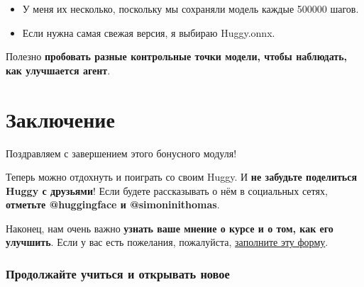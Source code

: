 \documentclass[11pt,a4paper]{article}
\begin{document}
\begin{itemize}
\tightlist
\item
  У меня их несколько, поскольку мы сохраняли модель каждые 500000 шагов.
\item
  Если нужна самая свежая версия, я выбираю Huggy.onnx.
\end{itemize}

Полезно \textbf{пробовать разные контрольные точки модели, чтобы наблюдать, как улучшается агент}.

\section{Заключение}\label{conclusion}

Поздравляем с завершением этого бонусного модуля!

Теперь можно отдохнуть и поиграть со своим Huggy. И \textbf{не забудьте поделиться Huggy с друзьями}! Если будете рассказывать о нём в социальных сетях, \textbf{отметьте @huggingface и @simoninithomas}.


Наконец, нам очень важно \textbf{узнать ваше мнение о курсе и о том, как его улучшить}. Если у вас есть пожелания, пожалуйста, \href{https://forms.gle/BzKXWzLAGZESGNaE9}{заполните эту форму}.

\subsubsection{Продолжайте учиться и открывать новое}\label{keep-learning-stay-awesome-1}
\end{document}
